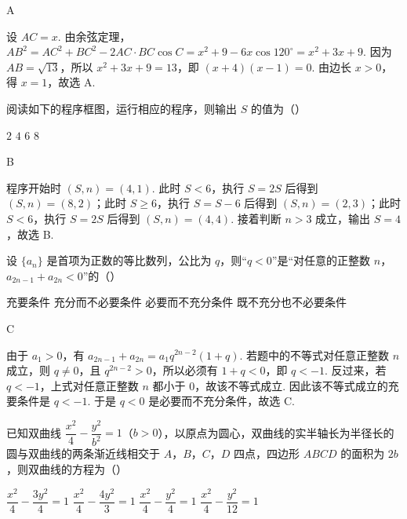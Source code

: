 \begin{answer}
A
\end{answer}

\begin{solution}
设 \(AC=x\). 由余弦定理，
\(AB^2=AC^2+BC^2-2AC\cdot BC\cos C=x^2+9-6x\cos120^\circ=x^2+3x+9\). 因为 \(AB=\sqrt{13}\)，所以 \(x^2+3x+9=13\)，即 \((x+4)(x-1)=0\). 由边长 \(x>0\)，得 \(x=1\)，故选 A.
\end{solution}

\begin{problem}
阅读如下的程序框图，运行相应的程序，则输出 \(S\) 的值为（\quad）


\choices
    {\(2\)}
    {\(4\)}
    {\(6\)}
    {\(8\)}
\end{problem}

\begin{answer}
B
\end{answer}

\begin{solution}
程序开始时 \((S,n)=(4,1)\). 此时 \(S<6\)，执行 \(S=2S\) 后得到 \((S,n)=(8,2)\)；此时 \(S\geqslant6\)，执行 \(S=S-6\) 后得到 \((S,n)=(2,3)\)；此时 \(S<6\)，执行 \(S=2S\) 后得到 \((S,n)=(4,4)\). 接着判断 \(n>3\) 成立，输出 \(S=4\)，故选 B.
\end{solution}

\begin{problem}
设 \(\{a_n\}\) 是首项为正数的等比数列，公比为 \(q\)，则“\(q<0\)”是“对任意的正整数 \(n\)，\(a_{2n-1}+a_{2n}<0\)”的（\quad）

\choices
    {充要条件}
    {充分而不必要条件}
    {必要而不充分条件}
    {既不充分也不必要条件}
\end{problem}

\begin{answer}
C
\end{answer}

\begin{solution}
由于 \(a_1>0\)，有
\(a_{2n-1}+a_{2n}=a_1q^{2n-2}(1+q)\). 若题中的不等式对任意正整数 \(n\) 成立，则 \(q\neq0\)，且 \(q^{2n-2}>0\)，所以必须有 \(1+q<0\)，即 \(q<-1\). 反过来，若 \(q<-1\)，上式对任意正整数 \(n\) 都小于 \(0\)，故该不等式成立. 因此该不等式成立的充要条件是 \(q<-1\). 于是 \(q<0\) 是必要而不充分条件，故选 C.
\end{solution}

\begin{problem}
已知双曲线 \(\dfrac{x^2}{4}-\dfrac{y^2}{b^2}=1\)（\(b>0\)），以原点为圆心，双曲线的实半轴长为半径长的圆与双曲线的两条渐近线相交于 \(A\)，\(B\)，\(C\)，\(D\) 四点，四边形 \(ABCD\) 的面积为 \(2b\)，则双曲线的方程为（\quad）

\choices
    {\(\dfrac{x^2}{4}-\dfrac{3y^2}{4}=1\)}
    {\(\dfrac{x^2}{4}-\dfrac{4y^2}{3}=1\)}
    {\(\dfrac{x^2}{4}-\dfrac{y^2}{4}=1\)}
    {\(\dfrac{x^2}{4}-\dfrac{y^2}{12}=1\)}
\end{problem}

